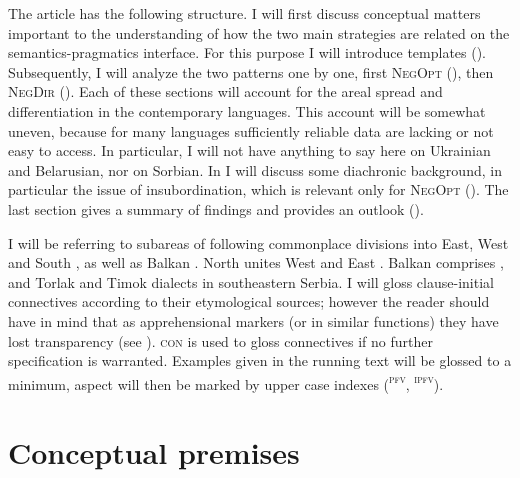 \documentclass[output=paper,colorlinks,citecolor=brown]{langscibook}
\begin{document}
The article has the following structure. I will first discuss conceptual matters important to the understanding of how the two main strategies are related on the semantics-pragmatics interface. For this purpose I will introduce templates (). Subsequently, I will analyze the two patterns one by one, first \textsc{NegOpt} (), then \textsc{NegDir} (). Each of these sections will account for the areal spread and differentiation in the contemporary languages. This account will be somewhat uneven, because for many  languages sufficiently reliable data are lacking or not easy to access. In particular, I will not have anything to say here on Ukrainian and Belarusian, nor on Sorbian. In  I will discuss some diachronic background, in particular the issue of insubordination, which is relevant only for \textsc{NegOpt} (). The last section gives a summary of findings and provides an outlook ().


I will be referring to subareas of  following commonplace divisions into East, West and South , as well as Balkan . North  unites West and East . Balkan  comprises ,  and Torlak and Timok dialects in southeastern Serbia. I will gloss clause-initial connectives according to their etymological sources; however the reader should have in mind that as apprehensional markers (or in similar functions) they have lost transparency (see ). \textsc{con} is used to gloss connectives if no further specification is warranted. Examples given in the running text will be glossed to a minimum, aspect will then be marked by upper case indexes (\textsc{\textsuperscript{pfv}}, \textsc{\textsuperscript{ipfv}}).


\section{Conceptual premises} \label{sec:conprem}
\end{document}
